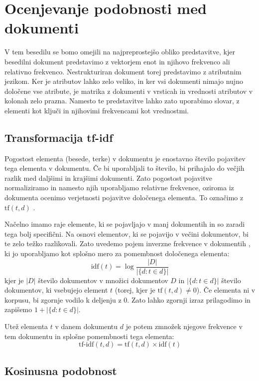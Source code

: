 \section{Ocenjevanje podobnosti med dokumenti}

V tem besedilu se bomo omejili na najpreprostejšo obliko predstavitve,
kjer besedilni dokument predstavimo z vektorjem enot in njihovo
frekvenco ali relativno frekvenco. Nestrukturiran dokument torej
predstavimo z atributnim jezikom. Ker je atributov lahko zelo veliko,
in ker vsi dokumenti nimajo nujno določene vse atribute, je matrika z
dokumenti v vrsticah in vrednosti atributov v kolonah zelo
prazna. Namesto te predstavitve lahko zato uporabimo slovar, z
elementi kot ključi in njihovimi frekvencami kot vrednostmi.

\subsection{Transformacija tf-idf}

Pogostost elementa (besede, terke) v dokumentu je enostavno število
pojavitev tega elementa v dokumentu. Če bi uporabljali to število, bi
prihajalo do večjih razlik med daljšimi in krajšimi dokumenti. Zato
pogostost pojavitve normaliziramo in namesto njih uporabljamo
relativne frekvence, oziroma iz dokumenta ocenimo verjetnosti
pojavitve določenega elementa. To označimo z $\mathrm{tf}(t,d)$
.

Načelno imamo raje elemente, ki se pojavljajo v manj dokumentih in so
zaradi tega bolj specifični. Na osnovi elementov, ki se pojavijo v
večini dokumentov, bi te zelo težko razlikovali. Zato uvedemo pojem
inverzne frekvence v dokumentih , ki
jo uporabljamo kot splošno mero za pomembnost določenega elementa:
$$\mathrm{idf}(t) =  \log \frac{|D|}{|\{d: t \in d\}|}$$
kjer je $|D|$ število dokumentov v množici dokumentov $D$ in $|\{d : t
\in d\}|$ število dokumentov, ki vsebujejo element $t$ (torej, kjer je
$\mathrm{tf}(t,d) \neq 0$). Če elementa ni v korpusu, bi zgornje
vodilo k deljenju z 0. Zato lahko zgornji izraz prilagodimo in
zapišemo $1 + |\{d : t \in d\}|$.

Utež elementa $t$ v danem dokumentu $d$ je potem zmnožek njegove
frekvence v tem dokumentu in splošne pomembnosti tega elementa:
$$\mathrm{tf\mbox{-}idf}(t,d) = \mathrm{tf}(t,d) \times \mathrm{idf}(t)$$

\subsection{Kosinusna podobnost}

